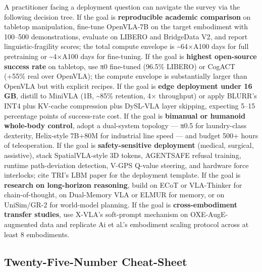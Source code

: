 \documentclass{article}
\begin{document}
A practitioner facing a deployment question can navigate the survey via the following decision tree. If the goal is \textbf{reproducible academic comparison} on tabletop manipulation, fine-tune OpenVLA-7B on the target embodiment with 100--500 demonstrations, evaluate on LIBERO and BridgeData V2, and report linguistic-fragility scores; the total compute envelope is \textasciitilde64×A100 days for full pretraining or \textasciitilde4×A100 days for fine-tuning. If the goal is \textbf{highest open-source success rate} on tabletop, use π0 fine-tuned (96.5\% LIBERO) or CogACT (+55\% real over OpenVLA); the compute envelope is substantially larger than OpenVLA but with explicit recipes. If the goal is \textbf{edge deployment under 16 GB}, distill to MiniVLA (1B, \textasciitilde85\% retention, 4× throughput) or apply BLURR's INT4 plus KV-cache compression plus DySL-VLA layer skipping, expecting 5--15 percentage points of success-rate cost. If the goal is \textbf{bimanual or humanoid whole-body control}, adopt a dual-system topology --- π0.5 for laundry-class dexterity, Helix-style 7B+80M for industrial line speed --- and budget 500+ hours of teleoperation. If the goal is \textbf{safety-sensitive deployment} (medical, surgical, assistive), stack SpatialVLA-style 3D tokens, AGENTSAFE refusal training, runtime path-deviation detection, V-GPS Q-value steering, and hardware force interlocks; cite TRI's LBM paper for the deployment template. If the goal is \textbf{research on long-horizon reasoning}, build on ECoT \cite{zawalski2024roboticcontrolviae} or VLA-Thinker \cite{wang2026vlathinkerboosting} for chain-of-thought, on Dual-Memory VLA \cite{li2026globalpriormeetslo} or ELMUR for memory, or on UniSim/GR-2 for world-model planning. If the goal is \textbf{cross-embodiment transfer studies}, use X-VLA's soft-prompt mechanism on OXE-AugE-augmented data and replicate Ai et al.'s embodiment scaling protocol across at least 8 embodiments.

\subsection{Twenty-Five-Number Cheat-Sheet}\label{twenty-five-number-cheat-sheet}
\end{document}
